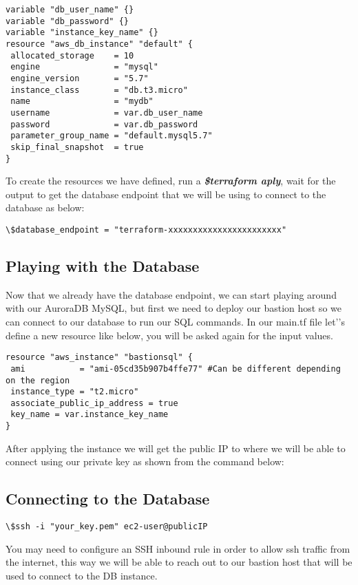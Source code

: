 \documentclass{article}
\begin{document}
\begin{lstlisting}[caption=Terraform main file]
variable "db_user_name" {}
variable "db_password" {}
variable "instance_key_name" {}
resource "aws_db_instance" "default" {
 allocated_storage    = 10
 engine               = "mysql"
 engine_version       = "5.7"
 instance_class       = "db.t3.micro"
 name                 = "mydb"
 username             = var.db_user_name
 password             = var.db_password
 parameter_group_name = "default.mysql5.7"
 skip_final_snapshot  = true
}
\end{lstlisting}

To create the resources we have defined, run a \textbf{\emph{\$terraform aply}}, wait for the output to get the database endpoint that we will be using to connect to the database as below:

\begin{lstlisting}[caption=Database Endpoint output]
\$database_endpoint = "terraform-xxxxxxxxxxxxxxxxxxxxxxx"
\end{lstlisting}

\subsection{Playing with the Database}

Now that we already have the database endpoint, we can start playing around with our AuroraDB MySQL, but first we need to deploy our bastion host so we can connect to our database to run our SQL commands. In our main.tf file let'’s define a new resource like below, you will be asked again for the input values.

\begin{lstlisting}[caption=Database Endpoint output]
resource "aws_instance" "bastionsql" {
 ami           = "ami-05cd35b907b4ffe77" #Can be different depending on the region
 instance_type = "t2.micro"
 associate_public_ip_address = true
 key_name = var.instance_key_name
}

\end{lstlisting}

After applying the instance we will get the public IP to where we will be able to connect using our private key as shown from the command below:

\subsection{Connecting to the Database}

\begin{lstlisting}[caption=Database Endpoint output]
\$ssh -i "your_key.pem" ec2-user@publicIP
\end{lstlisting}
You may need to configure an SSH inbound rule in order to allow ssh traffic from the internet, this way we will be able to reach out to our bastion host that will be used to connect to the DB instance. 
\end{document}

